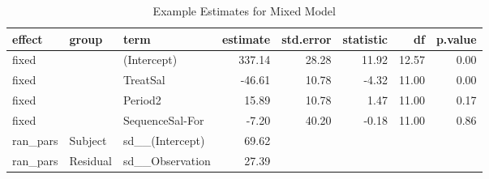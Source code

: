 \begin{table}[ht]
\centering
\begin{tabular}{lllrrrrr}
  \hline
effect & group & term & estimate & std.error & statistic & df & p.value \\ 
  \hline
fixed &  & (Intercept) & 337.14 & 28.28 & 11.92 & 12.57 & 0.00 \\ 
  fixed &  & TreatSal & -46.61 & 10.78 & -4.32 & 11.00 & 0.00 \\ 
  fixed &  & Period2 & 15.89 & 10.78 & 1.47 & 11.00 & 0.17 \\ 
  fixed &  & SequenceSal-For & -7.20 & 40.20 & -0.18 & 11.00 & 0.86 \\ 
  ran\_pars & Subject & sd\_\_(Intercept) & 69.62 &  &  &  &  \\ 
  ran\_pars & Residual & sd\_\_Observation & 27.39 &  &  &  &  \\ 
   \hline
\end{tabular}
\caption{Example Estimates for Mixed Model} 
\label{modelTable}
\end{table}

